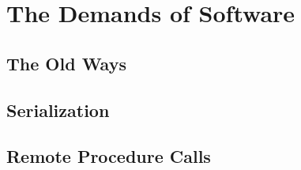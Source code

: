 
\chapter{The Demands of Software}\label{ch:softwaredemands}

\section{The Old Ways}

\section{Serialization}

\section{Remote Procedure Calls}